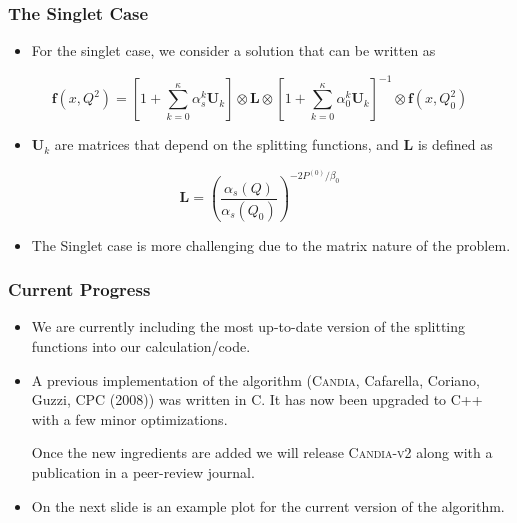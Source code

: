\documentclass{beamer}
\newcommand{\vv}[1]{\mathbf{\bm{#1}}}
\begin{document}
\begin{frame}
  \frametitle{The Singlet Case}

  \begin{itemize}
  \item For the singlet case, we consider a solution that can be written as 
  \end{itemize}

  \begin{equation}
    \vv{f}(x, Q^2) = \left[ 1 + \sum_{k=0}^{\kappa} \alpha_s^k \vv{U}_k \right] \otimes \vv{L} \otimes \left[ 1 + \sum_{k=0}^{\kappa} \alpha_0^k \vv{U}_k \right]^{-1} \otimes \vv{f}(x, Q_0^2)
  \end{equation}

  \begin{itemize}
  \item $\vv{U}_k$ are matrices that depend on the splitting functions, and $\vv{L}$ is defined as
  \end{itemize}

  \begin{equation}
    \vv{L} = \left( \frac{\alpha_s(Q)}{\alpha_s(Q_0)} \right)^{-2 P^{(0)}/\beta_0}
  \end{equation}
  
  \begin{itemize}
  \item The Singlet case is more challenging due to the matrix nature of the problem.
  \end{itemize}
\end{frame}


\begin{frame}
  \frametitle{Current Progress}

  \begin{itemize}
  \item We are currently including the most up-to-date version of the splitting functions into our calculation/code.
  
  \item A previous implementation of the algorithm (\textsc{Candia}, Cafarella, Coriano, Guzzi, CPC (2008)) was written in C. 
  It has now been upgraded to C++ with a few minor optimizations. 
  
  Once the new ingredients are added we will release \textsc{Candia-v2} along with a publication in a peer-review journal. 
  \item On the next slide is an example plot for the current version of the algorithm.
  \end{itemize}
\end{frame}
\end{document}
